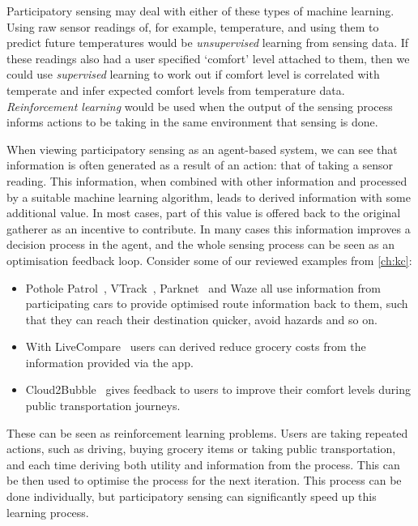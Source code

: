 Participatory sensing may deal with either of these types of machine learning.
Using raw sensor readings of, for example, temperature, and using them to
predict future temperatures would be \emph{unsupervised} learning from sensing
data. If these readings also had a user specified `comfort' level attached to
them, then we could use \emph{supervised} learning to work out if comfort
level is correlated with temperate and infer expected comfort levels from
temperature data. \emph{Reinforcement learning} would be used when the output
of the sensing process informs actions to be taking in the same environment
that sensing is done.

When viewing participatory sensing as an agent-based system, we can see that
information is often generated as a result of an action: that of taking a sensor
reading. This information, when combined with other information and processed
by a suitable machine learning algorithm, leads to derived information with
some additional value. In most cases, part of this value is offered back to
the original gatherer as an incentive to contribute. In many cases this
information improves a decision process in the agent, and the whole sensing
process can be seen as an optimisation feedback loop. Consider some of our
reviewed examples from \autoref{ch:kc}:

\begin{itemize}
\item Pothole Patrol~\citep{Eriksson2008}, VTrack~\citep{Thiagarajan2009}, Parknet~\citep{Mathur2010} and Waze all use information from participating cars to provide optimised route information back to them, such that they can reach their destination quicker, avoid hazards and so on.
\item With LiveCompare~\citep{Deng2009} users can derived reduce grocery costs from the information provided via the app.
\item Cloud2Bubble~\citep{Costa2012} gives feedback to users to improve their comfort levels during public transportation journeys.
\end{itemize}

These can be seen as reinforcement learning problems. Users are taking
repeated actions, such as driving, buying grocery items or taking public
transportation, and each time deriving both utility and information from the
process. This can be then used to optimise the process for the next iteration.
This process can be done individually, but participatory sensing can
significantly speed up this learning process.


